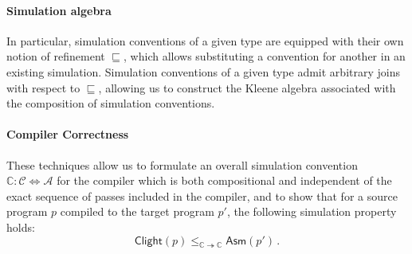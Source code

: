 \documentclass[sigplan,10pt,review,anonymous]{acmart}\settopmatter{printfolios=true,printccs=false,printacmref=false}
\newcommand{\kw}[1]{\ensuremath{ \mathsf{#1} }}
\begin{document}
\paragraph{Simulation algebra} %

In particular,
simulation conventions of a given type
are equipped with their own notion of refinement $\sqsubseteq$,
which allows substituting
a convention for another in an existing simulation.
Simulation conventions of a given type
admit arbitrary joins with respect to $\sqsubseteq$,
allowing us to construct the Kleene algebra
associated with the composition of simulation conventions.


\paragraph{Compiler Correctness} \label{sec:compcert:overview} %

These techniques allow us to formulate an overall
simulation convention
$\mathbb{C} : \mathcal{C} \Leftrightarrow \mathcal{A}$
for the compiler which is both compositional
and independent of the exact sequence of passes
included in the compiler,
and to show that for a source program $p$
compiled to the target program $p'$,
the following simulation property holds:
\[
    \kw{Clight}(p)
    \le_{\mathbb{C} \twoheadrightarrow \mathbb{C}}
    \kw{Asm}(p') \,.
\]


\end{document}
